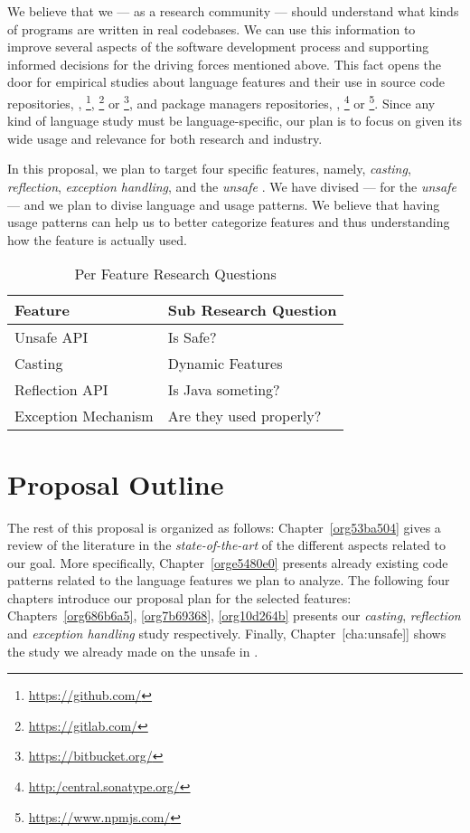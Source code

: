 
We believe that we --- as a research community --- should understand what kinds of programs are written in real codebases.
We can use this information to improve several aspects of the software development process and supporting informed decisions for the driving forces mentioned above.
This fact opens the door for empirical studies about language features and their use in source code repositories, \eg{}, \github \footnote{\url{https://github.com/}}, \gitlab \footnote{\url{https://gitlab.com/}} or \bitbucket \footnote{\url{https://bitbucket.org/}}, and package managers repositories, \eg{}, \mavencentral \footnote{\url{http:/central.sonatype.org/}} or \npm \footnote{\url{https://www.npmjs.com/}}.
Since any kind of language study must be language-specific, our plan is to focus on \java{} given its wide usage and relevance for both research and industry.

In this proposal, we plan to target four specific \java{} features, namely, \emph{casting}, \emph{reflection}, \emph{exception handling}, and the \emph{unsafe \api{}}.
We have divised --- for the \emph{unsafe \api{}} --- and we plan to divise language and \api{} usage patterns.
We believe that having usage patterns can help us to better categorize features and thus understanding how the feature is actually used.

\begin{table}[htbp]
\caption{Per Feature Research Questions}
\centering
\begin{tabular}{ll}
\hline
Feature & Sub Research Question\\
\hline
Unsafe API & Is \java{} Safe?\\
Casting & Dynamic Features\\
Reflection API & Is Java someting?\\
Exception Mechanism & Are they used properly?\\
\hline
\end{tabular}
\end{table}

\section{Proposal Outline}
\label{sec:orge74ed00}
The rest of this proposal is organized as follows:
Chapter~\ref{org53ba504} gives a review of the literature in the \emph{state-of-the-art} of the different aspects related to our goal.
More specifically, Chapter~\ref{orge5480e0} presents already existing code patterns related to the language features we plan to analyze.
The following four chapters introduce our proposal plan for the selected features:
Chapters~\ref{org686b6a5}, \ref{org7b69368}, \ref{org10d264b} presents our \emph{casting}, \emph{reflection} and \emph{exception handling} study respectively.
Finally, Chapter~[cha:unsafe]] shows the study we already made on the unsafe \api{} in \java{}.

